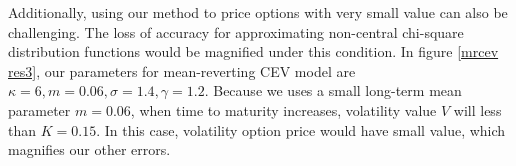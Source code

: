 Additionally, using our method to price options with very small value can also be challenging. The loss of accuracy for approximating non-central chi-square distribution functions would be magnified under this condition. In figure \ref{mrcev res3}, our parameters for mean-reverting CEV model are $\kappa=6, m=0.06, \sigma=1.4, \gamma=1.2$. Because we uses a small long-term mean parameter $m=0.06$, when time to maturity increases, volatility value $V$ will less than $K=0.15$. In this case, volatility option price would have small value, which magnifies our other errors.

\begin{figure}[t]
  \centering
  \hfill
   \\

\end{figure}

